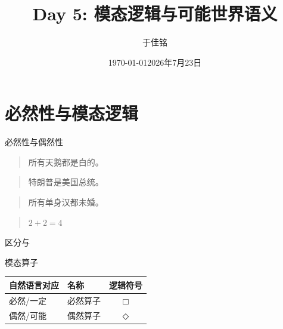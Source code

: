\documentclass{zhslides}
\title{Day 5: 模态逻辑与可能世界语义}
\date{\today}
\date{2026年7月23日}
\author{于佳铭}
\institute{唯理书院2026\\精确的逻辑与模糊的意义}
\begin{document}
\maketitle





\section{必然性与模态逻辑}

\begin{frame}{必然性与偶然性}

  \begin{quote}
    所有天鹅都是白的。
  \end{quote}
  \vspace{1em}
  \begin{quote}
    特朗普是美国总统。
  \end{quote}
  \vspace{1em}
  \begin{quote}
    所有单身汉都未婚。
  \end{quote}
  \vspace{1em}
  \begin{quote}
    $2+2=4$
  \end{quote}
  \vspace{1em}
  \pause
  
  区分与

\end{frame}


\begin{frame}{模态算子}
  
  \begin{table}[h]
  \centering
  {\renewcommand{\arraystretch}{1.2}
  \begin{tabular}{llc}
    \textbf{自然语言对应} & \textbf{名称} & \textbf{逻辑符号} \\\hline
    必然/一定 & 必然算子 & $\Box$ \\\pause
    偶然/可能 & 偶然算子 & $\Diamond$ \\
  \end{tabular}
  }
  \end{table}
  
\end{frame}
\end{document}

